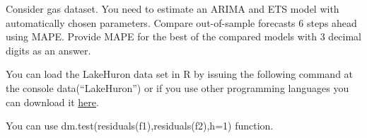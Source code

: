 
\begin{question}
Consider gas dataset. You need to estimate an ARIMA and ETS model with automatically chosen parameters. Compare out-of-sample forecasts 6 steps ahead using MAPE. Provide MAPE for the best of the compared models with 3 decimal digits as an answer.

You can load the LakeHuron data set in R by issuing the following command at the console data(``LakeHuron'') or if you use other programming languages you can download it \href{https://github.com/vincentarelbundock/Rdatasets/blob/master/csv/datasets/LakeHuron.csv}{here}.
\end{question}

\begin{solution}
You can use dm.test(residuals(f1),residuals(f2),h=1) function.
\end{solution}

